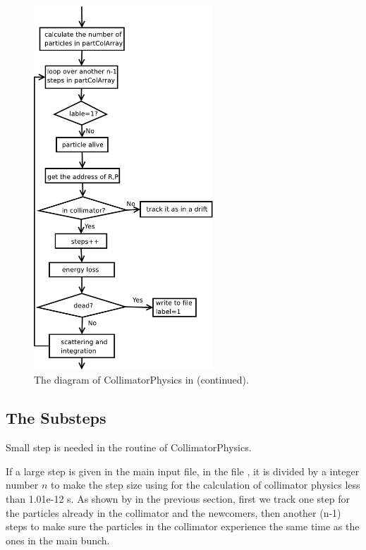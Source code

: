 \begin{figure}[ht!]
\begin{center}
\includegraphics[width=0.6\textwidth]{figures/partmatter/Diagram2}
\end{center}
\caption{The diagram of CollimatorPhysics in \opal (continued). }
\label{fig:diagram2}
\end{figure}
\clearpage

\subsection{The Substeps}

Small step is needed in the routine of CollimatorPhysics.

If a large step is given in the main input file, in the file ,
it is divided by a integer number $n$ to make the step size using for the calculation of collimator physics less than 1.01e-12 s. As shown
by   in the previous section, first we track one step for the particles already in the
collimator and the newcomers, then another (n-1) steps to make sure the particles in the collimator experience the same time as the ones
in the main bunch.

